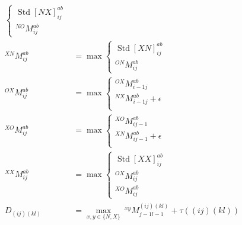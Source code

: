 \documentclass{article}
\newcommand{\N}[1]{\operatorname{Std}[#1]}
\begin{document}
\begin{align*}
\begin{cases}
    \N{NX}^{ab}_{ij}\\
    ^{NO}M^{ab}_{ij}
  \end{cases}\\
  ^{XN}M^{ab}_{ij} &= \max 
  \begin{cases}
    \N{XN}^{ab}_{ij}\\
    ^{ON}M^{ab}_{ij}
  \end{cases}\\
  ^{OX}M^{ab}_{ij} &= \max 
  \begin{cases}
    ^{OX}M^{ab}_{i-1j}\\
    ^{NX}M^{ab}_{i-1j}+\epsilon\\
  \end{cases}\\
  ^{XO}M^{ab}_{ij} &= \max 
  \begin{cases}
    ^{XO}M^{ab}_{ij-1}\\
    ^{XN}M^{ab}_{ij-1}+\epsilon\\
  \end{cases}\\
  ^{XX}M^{ab}_{ij} &= \max 
  \begin{cases}
    \N{XX}^{ab}_{ij}\\
    ^{OX}M^{ab}_{ij}\\
    ^{XO}M^{ab}_{ij}
  \end{cases}\\
  D_{(ij)(kl)} &= \max_{x,y\in\{N,X\}}\ ^{xy}M^{(ij)(kl)}_{j-1l-1} + \tau((ij)(kl))
\end{align*}
\end{document}
